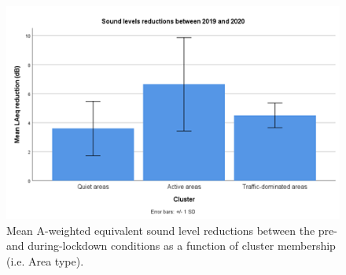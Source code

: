 \begin{figure}[h]
  \centering
  \includegraphics[width=.7\textwidth]{Figures/NoiseMappingLockdown Fig 8.png}
  \caption{Mean A-weighted equivalent sound level reductions between the pre- and during-lockdown conditions as a function of cluster membership (i.e. Area type). \label{fig:NsMapLockRedux}}
\end{figure}

